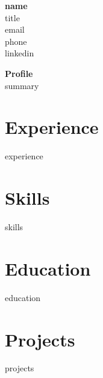 \documentclass[11pt]{article}
\begin{document}
\pagestyle{empty}
\begin{minipage}[t]{0.6\textwidth}
  {\LARGE\bfseries {name}}\\
  {\large {title}}\\
  {email}\\
  {phone}\\
  {linkedin}
\end{minipage}
\hfill
\begin{minipage}[t]{0.35\textwidth}
  \textbf{Profile}\\
  {summary}
\end{minipage}

\vspace{12pt}
\section*{Experience}
{experience}

\section*{Skills}
{skills}

\section*{Education}
{education}

\section*{Projects}
{projects}
\end{document}
